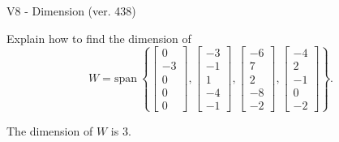 \begin{exercise}
  \begin{exerciseTitle}V8 - Dimension (ver. 438)\end{exerciseTitle}
  \begin{exerciseStatement}
    Explain how to find the dimension of 
\[W=\mathrm{span}\ \left\{\left[\begin{array}{r}
0 \\
-3 \\
0 \\
0 \\
0
\end{array}\right] , \left[\begin{array}{r}
-3 \\
-1 \\
1 \\
-4 \\
-1
\end{array}\right] , \left[\begin{array}{r}
-6 \\
7 \\
2 \\
-8 \\
-2
\end{array}\right] , \left[\begin{array}{r}
-4 \\
2 \\
-1 \\
0 \\
-2
\end{array}\right]\right\}.\]



  \end{exerciseStatement}
  \begin{exerciseAnswer}
   The dimension of \(W\) is  \(3\).
  


  \end{exerciseAnswer}
\end{exercise}